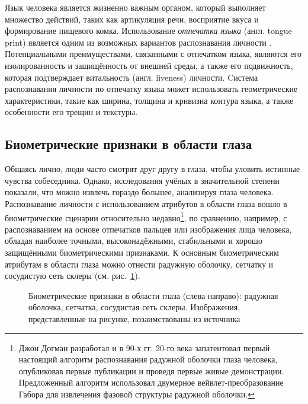 \documentclass[12pt]{book}
\begin{document}
\large{Язык человека является жизненно важным органом, который выполняет множество действий, таких как артикуляция речи, восприятие вкуса и формирование пищевого комка. Использование \textit{отпечатка языка} (англ. tongue print) является одним из возможных вариантов распознавания личности \cite{unar_2014, bhattacharyya_2023}. Потенциальными преимуществами, связанными с отпечатком языка, являются его изолированность и защищённость от внешней среды, а также его подвижность, которая подтверждает витальность (англ. liveness) личности. Cистема распознавания личности по отпечатку языка может использовать геометрические характеристики, такие как ширина, толщина и кривизна контура языка, а также особенности его трещин и текстуры.}

\subsection{Биометрические признаки в области глаза}

\large{Общаясь лично, люди часто смотрят друг другу в глаза, чтобы уловить истинные чувства собеседника. Однако, исследования учёных в значительной степени показали, что можно извлечь гораздо большее, анализируя глаза человека. Распознавание личности с использованием атрибутов в области глаза вошло в биометрические сценарии относительно недавно\footnote{Джон Догман разработал и в 90-х гг. 20-го века запатентовал первый настоящий алгоритм распознавания радужной оболочки глаза человека, опубликовав первые публикации и проведя первые живые демонстрации. Предложенный алгоритм использовал двумерное вейвлет-преобразование Габора для извлечения фазовой структуры радужной оболочки.}, по сравнению, например, с распознаванием на основе отпечатков пальцев или изображения лица человека, обладая наиболее точными, высоконадёжными, стабильными и хорошо защищёнными биометрическими признаками. К основным биометрическим атрибутам в области глаза можно отнести радужную оболочку, сетчатку и сосудистую сеть склеры (см. рис.~\ref{fig:figure_1_4}).}

\begin{figure}[]
\caption{Биометрические признаки в области глаза (слева направо): радужная оболочка, сетчатка, сосудистая сеть склеры. Изображения, представленные на рисунке, позаимствованы из источника \cite{unar_2014}}
\label{fig:figure_1_4}
\end{figure}
\end{document}
